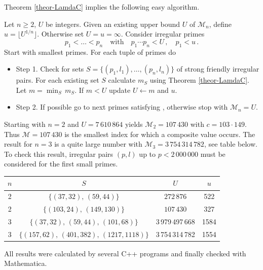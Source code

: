 \documentclass[12pt,english]{article}
\begin{document}
Theorem \ref{theor-LamdaC} implies the following easy algorithm.

\begin{algo}
Let $n \geq 2$, $U$ be integers. Given an existing upper bound $U$ of $\mathcal{M}_n$,
define $u = \lfloor U^{1/n} \rfloor$. Otherwise set $U=u=\infty$.
Consider irregular primes
\begin{equation} \label{eqn-loc-algo-1}
  p_1 < \ldots < p_n \quad \mbox{with} \quad p_1 \cdots p_n < U \,, \quad p_1 < u \,.
\end{equation}
Start with smallest primes. For each tuple of primes do
\begin{itemize}
\item Step 1.
  Check for sets $S=\{ (p_1,l_1), \ldots, (p_n,l_n) \}$ of strong friendly irregular pairs.
  For each existing set $S$ calculate $m_S$ using Theorem \ref{theor-LamdaC}.
  Let $m=\min_S \, m_S$. If $m < U$ update $U \leftarrow m$ and $u$.
\item Step 2.
  If possible go to next primes satisfying ,
  otherwise stop with $\mathcal{M}_n=U$.
\end{itemize}
\end{algo}
\bigskip

Starting with $n=2$ and $U = 7\,610\,864$ yields $\mathcal{M}_2 = 107\,430$ with
$c=103 \cdot 149$.
Thus $\mathcal{M} = 107\,430$ is the smallest index for which a composite value
occurs. The result for $n=3$ is a quite large number with $\mathcal{M}_3 = 3\,754\,314\,782$,
see table below.
To check this result, irregular pairs $(p,l)$ up to $p < 2\,000\,000$ must be considered
for the first small primes.

\begin{center}
\begin{tabular}{|c|c|c|c|} \hline
$n$ & $S$ & $U$ & $u$ \\ \hline\hline
2 & $\{(37,32), \,(59,44)\}$    & $272\,876$ & 522 \\ \hline
2 & $\{(103,24), \,(149,130)\}$ & $107\,430$ & 327 \\ \hline\hline
3 & $\{(37,32), \,(59,44), \, (101,68)\}$ & 3\,979\,497\,668 & 1584 \\ \hline
3 & $\{(157,62), \,(401,382), \, (1217,1118)\}$ & 3\,754\,314\,782 & 1554 \\ \hline
\end{tabular}
\end{center}
\medskip

All results were calculated by several C++ programs and finally checked with Mathematica.
\end{document}
